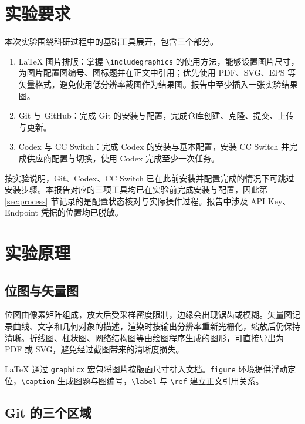\documentclass{SYSUReport}
\date{2026 年 9 月 10 日}
\begin{document}
\cover
\thispagestyle{empty}
\clearpage

\tableofcontents
\clearpage

\setcounter{page}{1}

\section{实验要求}

本次实验围绕科研过程中的基础工具展开，包含三个部分。

\begin{enumerate}
    \item LaTeX 图片排版：掌握 \verb|\includegraphics| 的使用方法，能够设置图片尺寸，为图片配置图编号、图标题并在正文中引用；优先使用 PDF、SVG、EPS 等矢量格式，避免使用低分辨率截图作为结果图。报告中至少插入一张实验结果图。
    \item Git 与 GitHub：完成 Git 的安装与配置，完成仓库创建、克隆、提交、上传与更新。
    \item Codex 与 CC Switch：完成 Codex 的安装与基本配置，安装 CC Switch 并完成供应商配置与切换，使用 Codex 完成至少一次任务。
\end{enumerate}

按实验说明，Git、Codex、CC Switch 已在此前安装并配置完成的情况下可跳过安装步骤。本报告对应的三项工具均已在实验前完成安装与配置，因此第 \ref{sec:process} 节记录的是配置状态核对与实际操作过程。报告中涉及 API Key、Endpoint 凭据的位置均已脱敏。

\section{实验原理}

\subsection{位图与矢量图}

位图由像素矩阵组成，放大后受采样密度限制，边缘会出现锯齿或模糊。矢量图记录曲线、文字和几何对象的描述，渲染时按输出分辨率重新光栅化，缩放后仍保持清晰。折线图、柱状图、网络结构图等由绘图程序生成的图形，可直接导出为 PDF 或 SVG，避免经过截图带来的清晰度损失。

LaTeX 通过 \verb|graphicx| 宏包将图片按版面尺寸排入文档。\verb|figure| 环境提供浮动定位，\verb|\caption| 生成图题与图编号，\verb|\label| 与 \verb|\ref| 建立正文引用关系。

\subsection{Git 的三个区域}
\end{document}
